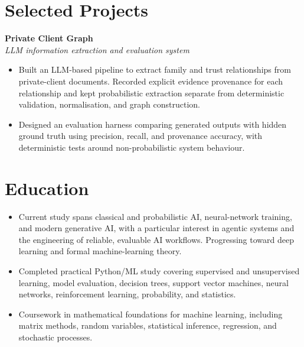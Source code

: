 \documentclass[11pt,letterpaper]{article}
\begin{document}
\section*{Selected Projects}
\textbf{Private Client Graph}\\[-1pt]
\textit{LLM information extraction and evaluation system}\vspace{-2pt}
\begin{itemize}
  \item Built an LLM-based pipeline to extract family and trust relationships from private-client documents. Recorded explicit evidence provenance for each relationship and kept probabilistic extraction separate from deterministic validation, normalisation, and graph construction.
  \item Designed an evaluation harness comparing generated outputs with hidden ground truth using precision, recall, and provenance accuracy, with deterministic tests around non-probabilistic system behaviour.
\end{itemize}

\section*{Education}
\begin{itemize}
  \item Current study spans classical and probabilistic AI, neural-network training, and modern generative AI, with a particular interest in agentic systems and the engineering of reliable, evaluable AI workflows. Progressing toward deep learning and formal machine-learning theory.
\end{itemize}

\begin{itemize}
  \item Completed practical Python/ML study covering supervised and unsupervised learning, model evaluation, decision trees, support vector machines, neural networks, reinforcement learning, probability, and statistics.
\end{itemize}

\begin{itemize}
  \item Coursework in mathematical foundations for machine learning, including matrix methods, random variables, statistical inference, regression, and stochastic processes.
\end{itemize}
\end{document}
